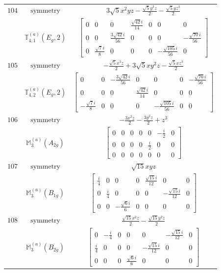 \documentclass[fleqn,8pt,landscape]{jsarticle}
\begin{document}
\begin{longtable}{ccc}
$ 104 $ & $ \text{symmetry} $ & $ 3 \sqrt{5} x^{2} y z - \frac{\sqrt{5} y^{3} z}{2} - \frac{\sqrt{5} y z^{3}}{2} $ \\
$  $ & $ \mathbb{T}_{4,1}^{(a)}(E_{g},2) $ & $ \begin{bmatrix} 0 & 0 & 0 & \frac{\sqrt{42} i}{14} & 0 & 0 & 0 \\ 0 & 0 & \frac{3 \sqrt{42} i}{56} & 0 & 0 & 0 & - \frac{\sqrt{70} i}{56} \\ 0 & \frac{\sqrt{7} i}{8} & 0 & 0 & 0 & - \frac{\sqrt{105} i}{56} & 0 \end{bmatrix} $ \\ \hline
$ 105 $ & $ \text{symmetry} $ & $ - \frac{\sqrt{5} x^{3} z}{2} + 3 \sqrt{5} x y^{2} z - \frac{\sqrt{5} x z^{3}}{2} $ \\
$  $ & $ \mathbb{T}_{4,2}^{(a)}(E_{g},2) $ & $ \begin{bmatrix} 0 & 0 & - \frac{3 \sqrt{42} i}{56} & 0 & 0 & 0 & - \frac{\sqrt{70} i}{56} \\ 0 & 0 & 0 & \frac{\sqrt{42} i}{14} & 0 & 0 & 0 \\ - \frac{\sqrt{7} i}{8} & 0 & 0 & 0 & - \frac{\sqrt{105} i}{56} & 0 & 0 \end{bmatrix} $ \\ \hline
$ 106 $ & $ \text{symmetry} $ & $ - \frac{3 x^{2} z}{2} - \frac{3 y^{2} z}{2} + z^{3} $ \\
$  $ & $ \mathbb{M}_{3}^{(a)}(A_{2g}) $ & $ \begin{bmatrix} 0 & 0 & 0 & 0 & 0 & - \frac{i}{2} & 0 \\ 0 & 0 & 0 & 0 & \frac{i}{2} & 0 & 0 \\ 0 & 0 & 0 & 0 & 0 & 0 & 0 \end{bmatrix} $ \\ \hline
$ 107 $ & $ \text{symmetry} $ & $ \sqrt{15} x y z $ \\
$  $ & $ \mathbb{M}_{3}^{(a)}(B_{1g}) $ & $ \begin{bmatrix} \frac{i}{4} & 0 & 0 & 0 & \frac{\sqrt{15} i}{12} & 0 & 0 \\ 0 & \frac{i}{4} & 0 & 0 & 0 & - \frac{\sqrt{15} i}{12} & 0 \\ 0 & 0 & - \frac{\sqrt{6} i}{6} & 0 & 0 & 0 & 0 \end{bmatrix} $ \\ \hline
$ 108 $ & $ \text{symmetry} $ & $ \frac{\sqrt{15} x^{2} z}{2} - \frac{\sqrt{15} y^{2} z}{2} $ \\
$  $ & $ \mathbb{M}_{3}^{(a)}(B_{2g}) $ & $ \begin{bmatrix} 0 & - \frac{i}{4} & 0 & 0 & 0 & - \frac{\sqrt{15} i}{12} & 0 \\ \frac{i}{4} & 0 & 0 & 0 & - \frac{\sqrt{15} i}{12} & 0 & 0 \\ 0 & 0 & 0 & \frac{\sqrt{6} i}{6} & 0 & 0 & 0 \end{bmatrix} $ \\ \hline

\end{longtable}
\end{document}
